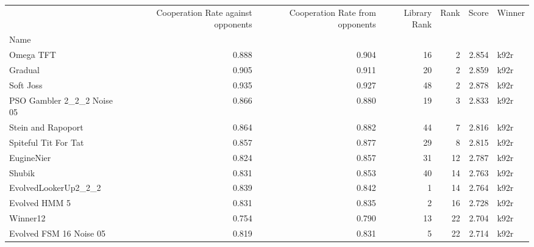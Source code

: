\begin{tabular}{lrrrrrl}
\toprule
{} &  Cooperation Rate against opponents &  Cooperation Rate from opponents &  Library Rank &  Rank &  Score & Winner \\
Name                       &                                     &                                  &               &       &        &        \\
\midrule
Omega TFT                  &                               0.888 &                            0.904 &            16 &     2 &  2.854 &   k92r \\
Gradual                    &                               0.905 &                            0.911 &            20 &     2 &  2.859 &   k92r \\
Soft Joss                  &                               0.935 &                            0.927 &            48 &     2 &  2.878 &   k92r \\
PSO Gambler 2\_2\_2 Noise 05 &                               0.866 &                            0.880 &            19 &     3 &  2.833 &   k92r \\
Stein and Rapoport         &                               0.864 &                            0.882 &            44 &     7 &  2.816 &   k92r \\
Spiteful Tit For Tat       &                               0.857 &                            0.877 &            29 &     8 &  2.815 &   k92r \\
EugineNier                 &                               0.824 &                            0.857 &            31 &    12 &  2.787 &   k92r \\
Shubik                     &                               0.831 &                            0.853 &            40 &    14 &  2.763 &   k92r \\
EvolvedLookerUp2\_2\_2       &                               0.839 &                            0.842 &             1 &    14 &  2.764 &   k92r \\
Evolved HMM 5              &                               0.831 &                            0.835 &             2 &    16 &  2.728 &   k92r \\
Winner12                   &                               0.754 &                            0.790 &            13 &    22 &  2.704 &   k92r \\
Evolved FSM 16 Noise 05    &                               0.819 &                            0.831 &             5 &    22 &  2.714 &   k92r \\

\end{tabular}
